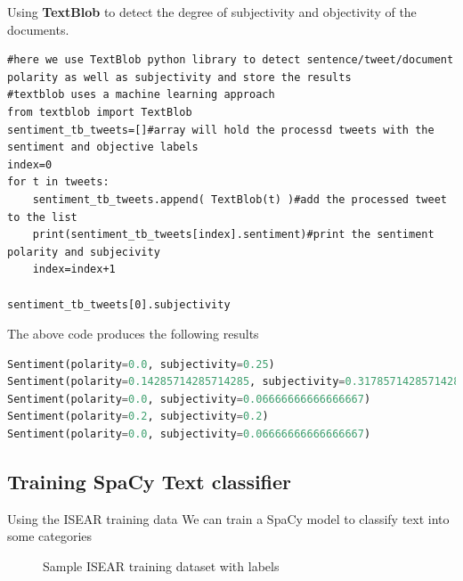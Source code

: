 Using \textbf{TextBlob} to detect the degree of subjectivity and objectivity of the documents.


\begin{lstlisting}
#here we use TextBlob python library to detect sentence/tweet/document polarity as well as subjectivity and store the results
#textblob uses a machine learning approach
from textblob import TextBlob
sentiment_tb_tweets=[]#array will hold the processd tweets with the sentiment and objective labels
index=0
for t in tweets:
    sentiment_tb_tweets.append( TextBlob(t) )#add the processed tweet to the list
    print(sentiment_tb_tweets[index].sentiment)#print the sentiment polarity and subjecivity
    index=index+1
    
sentiment_tb_tweets[0].subjectivity
\end{lstlisting}


The above code produces the following results


\begin{lstlisting}[language=Python]
Sentiment(polarity=0.0, subjectivity=0.25)
Sentiment(polarity=0.14285714285714285, subjectivity=0.31785714285714284)
Sentiment(polarity=0.0, subjectivity=0.06666666666666667)
Sentiment(polarity=0.2, subjectivity=0.2)
Sentiment(polarity=0.0, subjectivity=0.06666666666666667)
\end{lstlisting}

\clearpage

\subsection{Training SpaCy Text classifier}
Using the ISEAR training data
We can train a SpaCy model to classify text into some categories
\begin{figure}[h]
  \centering
  \caption{Sample ISEAR training dataset with labels}
  \label{fig:ALAP:sm1}
\end{figure}

